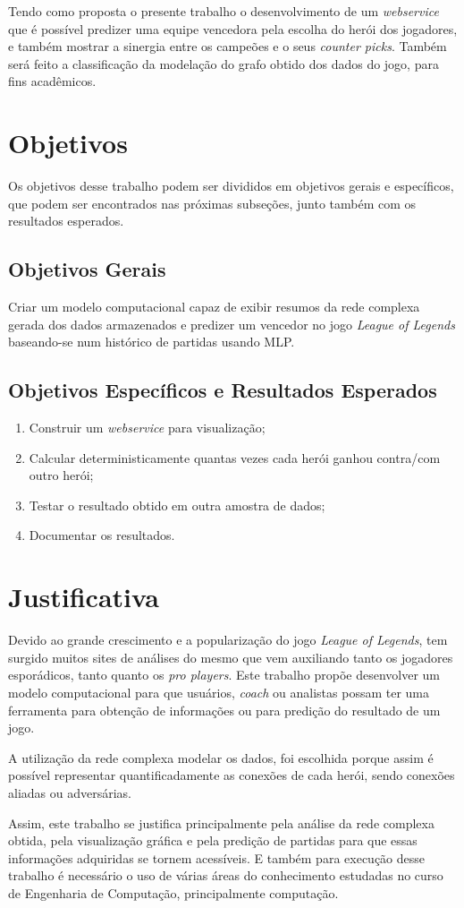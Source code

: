 Tendo como proposta o presente trabalho o desenvolvimento de um \textit{webservice} que é possível predizer uma equipe vencedora pela escolha do herói dos jogadores, e também mostrar a sinergia entre os campeões e o seus \textit{counter picks}. Também será feito a classificação da modelação do grafo obtido dos dados do jogo, para fins acadêmicos.

\section{Objetivos}
Os objetivos desse trabalho podem ser divididos em objetivos gerais e específicos, que podem ser encontrados nas próximas subseções, junto também com os resultados esperados.
\subsection{Objetivos Gerais}
Criar um modelo computacional capaz de exibir resumos da rede complexa gerada dos dados armazenados e predizer um vencedor no jogo \textit{League of Legends} baseando-se num histórico de partidas usando MLP.

\subsection{Objetivos Específicos e Resultados Esperados}

\begin{enumerate}
\item Construir um \textit{webservice} para visualização;
\item Calcular deterministicamente quantas vezes cada herói ganhou contra/com outro herói;
\item Testar o resultado obtido em outra amostra de dados;
\item Documentar os resultados.

\end{enumerate}

\section{Justificativa}
Devido ao grande crescimento e a popularização do jogo \textit{League of Legends}, tem surgido muitos sites de análises do mesmo que vem auxiliando tanto os jogadores esporádicos, tanto quanto os \textit{pro players}.
Este trabalho propõe desenvolver um modelo computacional para que usuários, \textit{coach} ou analistas possam ter uma ferramenta para obtenção de informações ou para predição do resultado de um jogo.

A utilização da rede complexa modelar os dados, foi escolhida porque assim é possível representar quantificadamente as conexões de cada herói, sendo conexões aliadas ou adversárias.

Assim, este trabalho se justifica principalmente pela análise da rede complexa obtida, pela visualização gráfica e pela predição de partidas para que essas informações adquiridas se tornem acessíveis. E também para execução desse trabalho é necessário o uso de várias áreas do conhecimento estudadas no curso de Engenharia de Computação, principalmente computação.